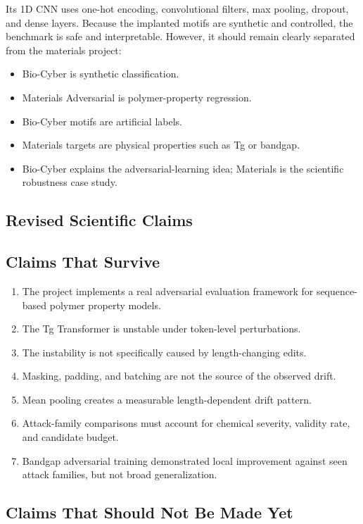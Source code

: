 \documentclass[11pt]{article}
\begin{document}
Its 1D CNN uses one-hot encoding, convolutional filters, max pooling, dropout,
and dense layers. Because the implanted motifs are synthetic and controlled, the
benchmark is safe and interpretable. However, it should remain clearly separated
from the materials project:
\begin{itemize}
  \item Bio-Cyber is synthetic classification.
  \item Materials Adversarial is polymer-property regression.
  \item Bio-Cyber motifs are artificial labels.
  \item Materials targets are physical properties such as Tg or bandgap.
  \item Bio-Cyber explains the adversarial-learning idea; Materials is the scientific robustness case study.
\end{itemize}

\subsection{Revised Scientific Claims}

\subsection{Claims That Survive}

\begin{enumerate}
  \item The project implements a real adversarial evaluation framework for sequence-based polymer property models.
  \item The Tg Transformer is unstable under token-level perturbations.
  \item The instability is not specifically caused by length-changing edits.
  \item Masking, padding, and batching are not the source of the observed drift.
  \item Mean pooling creates a measurable length-dependent drift pattern.
  \item Attack-family comparisons must account for chemical severity, validity rate, and candidate budget.
  \item Bandgap adversarial training demonstrated local improvement against seen attack families, but not broad generalization.
\end{enumerate}

\subsection{Claims That Should Not Be Made Yet}
\end{document}

